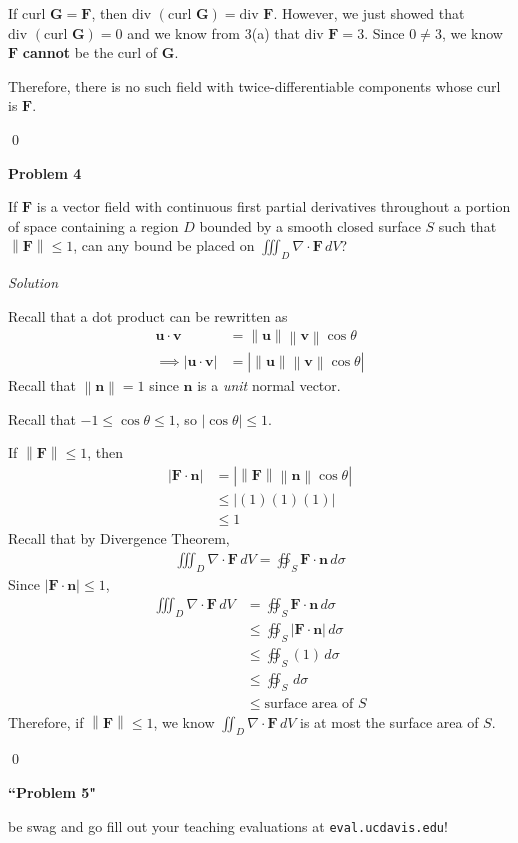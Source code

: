 \documentclass{article}
\newcommand{\lrp}[1]{\left( #1 \right)}
\newcommand{\norm}[1]{\left\lVert #1 \right\rVert}
\renewcommand{\u}[0]{\mathbf{u}}
\renewcommand{\v}[0]{\mathbf{v}}
\newcommand{\F}[0]{\mathbf{F}}
\newcommand{\G}[0]{\mathbf{G}}
\newcommand{\n}[0]{{\mathbf{n}}}
\newcommand{\Solution}{\textit{Solution}}
\begin{document}
If $\text{curl }\G = \F$, then $\text{div }\lrp{\text{curl } \G}=\text{div }\F$. However, we just showed that $\text{div }\lrp{\text{curl } \G}=0$ and we know from 3(a) that $\text{div }\F=3$. Since $0\neq 3$, we know $\F$ \textbf{cannot} be the curl of $\G$.

Therefore, there is no such field with twice-differentiable components whose curl is $\F$.

\qed

{}\textbf{Problem 4}

If $\F$ is a vector field with continuous first partial derivatives throughout a portion of
space containing a region $D$ bounded by a smooth closed surface $S$ such that $\norm{\F}\leq 1$,
can any bound be placed on $\displaystyle\iiint_D \nabla \cdot \F\,dV$?


\Solution

Recall that a dot product can be rewritten as
\begin{align*}
    \u \cdot \v &= \norm{\u}\norm{\v}\cos\theta\\
    \implies \left| \u \cdot \v\right| &= \left|\norm{\u}\norm{\v}\cos\theta\right|
\end{align*}
Recall that $\norm{\n}=1$ since $\n$ is a \textit{unit} normal vector.

Recall that $-1\leq \cos\theta\leq 1$, so $\left|\cos\theta\right|\leq 1$.

If $\norm{\F}\leq 1$, then
\begin{align*}
    \left|\F \cdot \n\right| &= \left|\norm{\F}\norm{\n}\cos\theta\right|\\
    &\leq \left|(1)(1)(1)\right|\\
    &\leq 1
\end{align*}
Recall that by Divergence Theorem,
\begin{align*}
    \iiint_D \nabla \cdot \F\,dV=\oiint_S \F\cdot \n \,d\sigma
\end{align*}
Since $\left|\F\cdot\n\right|\leq 1$,
\begin{align*}
     \iiint_D \nabla \cdot \F\,dV&=\oiint_S \F\cdot \n \,d\sigma\\
     &\leq \oiint_S \left|\F\cdot \n \right|\,d\sigma\\
     &\leq \oiint_S (1)\,d\sigma\\
     &\leq \oiint_S \,d\sigma\\
     &\leq \text{surface area of $S$}\tag{$\displaystyle\oiint_S\,d\sigma$ is just the surface area of $S$}
\end{align*}
Therefore, if $\norm{\F}\leq 1$, we know $\displaystyle \iint_D \nabla \cdot \F\,dV$ is at most the surface area of $S$.

\qed

{}\textbf{``Problem 5"}

be swag and go fill out your teaching evaluations at \texttt{eval.ucdavis.edu}!
\end{document}
